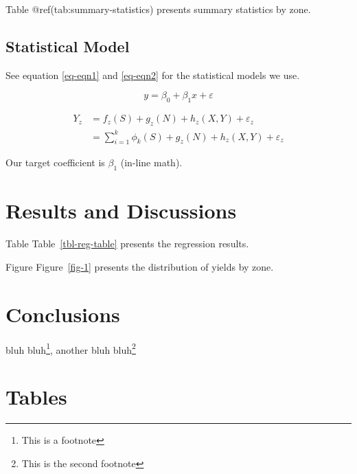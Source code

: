 \documentclass[
  12pt,
  letterpaper,
  DIV=11,
  numbers=noendperiod]{scrartcl}
\begin{document}
Table @ref(tab:summary-statistics) presents summary statistics by zone.

\hypertarget{statistical-model}{%
\subsection{Statistical Model}\label{statistical-model}}

See equation \ref{eq-eqn1} and \ref{eq-eqn2} for the statistical models
we use.

\begin{equation}
y = \beta_0 + \beta_1 x + \varepsilon \label{eq-eqn1}
\end{equation}

\begin{align}
Y_z & = f_z(S) + g_z(N) + h_z(X,Y) + \varepsilon_z \\
& = \sum_{i=1}^k \phi_k(S) + g_z(N) + h_z(X,Y) + \varepsilon_z \label{eq-eqn2}
\end{align}

Our target coefficient is \(\beta_1\) (in-line math).

\hypertarget{results-and-discussions}{%
\section{Results and Discussions}\label{results-and-discussions}}

Table Table~\ref{tbl-reg-table} presents the regression results.

Figure Figure~\ref{fig-1} presents the distribution of yields by zone.

\hypertarget{conclusions}{%
\section{Conclusions}\label{conclusions}}

bluh bluh\footnote{This is a footnote}, another bluh bluh\footnote{This
  is the second footnote}

\newpage

\hypertarget{tables}{%
\section{Tables}\label{tables}}
\end{document}
